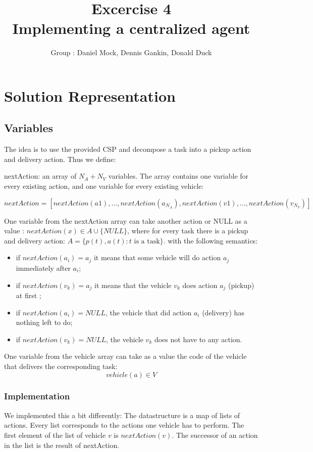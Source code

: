 \documentclass[11pt]{article}
\title{\bf Excercise 4\\ Implementing a centralized agent}
\author{Group \textnumero 29 : Daniel Mock, Dennis Gankin, Donald Duck}
\begin{document}
\maketitle

\section{Solution Representation}

\subsection{Variables}
The idea is to use the provided CSP and decompose a task into a pickup action and delivery action. Thus we define:

nextAction: 
an array of $N_A +N_V$ variables. 
The array contains one variable	for every existing action, and one variable for every existing vehicle:
\begin {center}
$nextAction = [nextAction(a1), . . . , nextAction(a_{N_A}
), nextAction(v1), . . ., nextAction(v_{N_V}
)]$
\end{center}
One variable from the nextAction array can take another action
or NULL as a value :
$nextAction(x) \in A \cup \{NULL\}$, where for every task there is a pickup and delivery action:
$A = \{p(t), a(t) \colon t \text{ is a task}\}$.
with the following semantics:
\begin{itemize}
	\item  if $nextAction(a_i) = a_j$ it means that some vehicle will do action $a_j$ immediately after $a_i$;
	\item  if $nextAction(v_k) = a_j$ it means that the vehicle $v_k$ does action $a_j$ (pickup) at first ;
	\item if $nextAction(a_i) = NULL$, the vehicle that did action $a_i$ (delivery) has nothing left to do;
	\item if $nextAction(v_k) = NULL$, the vehicle $v_k$ does not have to any action.
\end{itemize}

One variable from the vehicle array can take as a value the code of the
vehicle that delivers the corresponding task:
$$ vehicle(a) \in V$$

\subsubsection{Implementation}
We implemented this a bit differently:
The datastructure is a map of lists of actions.
Every list corresponds to the actions one vehicle has to perform.
The first element of the list of vehicle $v$ is $nextAction(v)$.
The successor of an action in the list is the result of nextAction.
\end{document}
